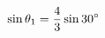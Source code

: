 \documentclass[preview]{standalone}
\begin{document}
\begin{align*}
\special{dvisvgm:raw <g id='unique000'>}\sin\theta_1 = \frac{4}{3} \sin 30^\circ\special{dvisvgm:raw </g>}
\end{align*}
\end{document}
